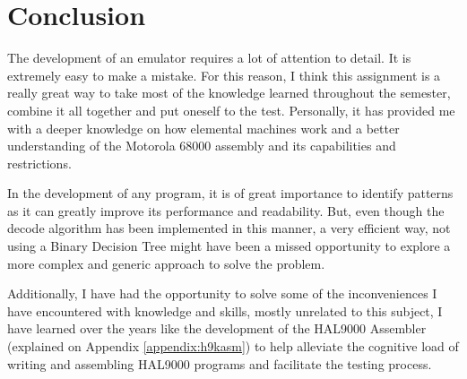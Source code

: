 \documentclass[11pt, a4paper]{article}
\begin{document}
\vfill
\pagebreak
\section{Conclusion}
The development of an emulator requires a lot of attention to detail. It is extremely easy to make
a mistake. For this reason, I think this assignment is a really great way to take most of the
knowledge learned throughout the semester, combine it all together and put oneself to the test.
Personally, it has provided me with a deeper knowledge on how elemental machines work and a better
understanding of the Motorola 68000 assembly and its capabilities and restrictions.

In the development of any program, it is of great importance to identify patterns as it can greatly
improve its performance and readability. But, even though the decode algorithm has been implemented
in this manner, a very efficient way, not using a Binary Decision Tree might have been a missed
opportunity to explore a more complex and generic approach to solve the problem.

Additionally, I have had the opportunity to solve some of the inconveniences I have encountered
with knowledge and skills, mostly unrelated to this subject, I have learned over the years like the development of the
HAL9000 Assembler (explained on Appendix \ref{appendix:h9kasm}) to help alleviate the cognitive load of
writing and assembling HAL9000 programs and facilitate the testing process.
\end{document}
